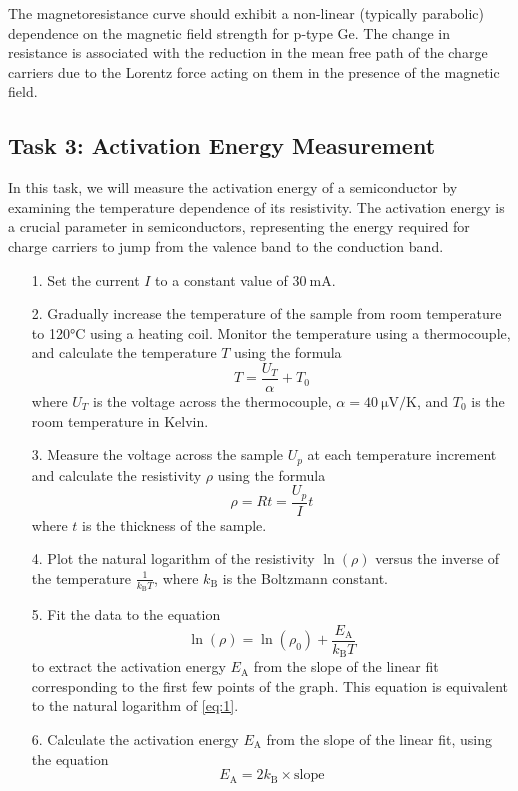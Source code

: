 \documentclass[11pt]{article}
\begin{document}
	The magnetoresistance curve should exhibit a non-linear (typically parabolic) dependence on the magnetic field strength for p-type Ge. The change in resistance is associated with the reduction in the mean free path of the charge carriers due to the Lorentz force acting on them in the presence of the magnetic field.
	
\clearpage
	
	\subsection{Task 3: Activation Energy Measurement}
	
	In this task, we will measure the activation energy of a semiconductor by examining the temperature dependence of its resistivity. The activation energy is a crucial parameter in semiconductors, representing the energy required for charge carriers to jump from the valence band to the conduction band.
	
	\begin{enumerate}
		\item[1.] Set the current $I$ to a constant value of $\qty{30}{\milli\ampere}$.
		\item[2.] Gradually increase the temperature of the sample from room temperature to 120°C using a heating coil. Monitor the temperature using a thermocouple, and calculate the temperature $T$ using the formula 
		\begin{equation}
			T = \frac{U_T}{\alpha} + T_0 \label{eq:8}
		\end{equation} 
		where $U_T$ is the voltage across the thermocouple, $\alpha = \qty{40}{\micro\volt\per\kelvin}$, and $T_0$ is the room temperature in Kelvin.
		\item[3.] Measure the voltage across the sample $U_p$ at each temperature increment and calculate the resistivity $\rho$ using the formula 
		\begin{equation}
			\rho = Rt = \frac{U_p}{I} t \label{eq:9}
		\end{equation}
		where $t$ is the thickness of the sample.
		\item[4.] Plot the natural logarithm of the resistivity $\ln(\rho)$ versus the inverse of the temperature $\frac{1}{k_\mathrm{B} T}$, where $k_\mathrm{B}$ is the Boltzmann constant.
		\item[5.] Fit the data to the equation
		\begin{equation}
			\ln(\rho) = \ln(\rho_0) + \frac{E_\mathrm{A}}{k_\mathrm{B} T} \label{eq:10}
		\end{equation}
		to extract the activation energy $E_\mathrm{A}$ from the slope of the linear fit corresponding to the first few points of the graph. This equation is equivalent to the natural logarithm of \ref{eq:1}.
		\item[6.] Calculate the activation energy $E_\mathrm{A}$ from the slope of the linear fit, using the equation
		\begin{equation}
			E_\mathrm{A} = 2k_\mathrm{B} \times \text{slope} \label{eq:11}
		\end{equation}
		
	\end{enumerate}
	
\end{document}
